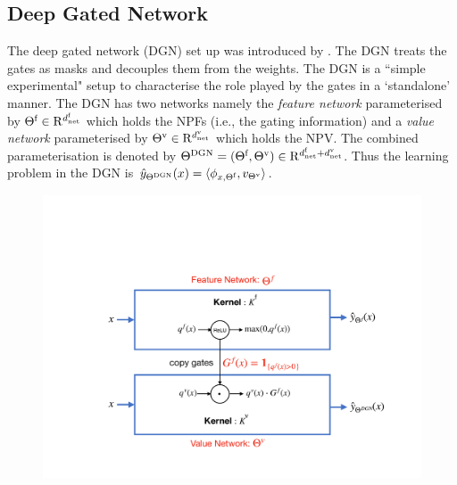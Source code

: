 \subsection{Deep Gated Network}
The deep gated network (DGN) set up was introduced by \cite{npk}. The DGN treats the gates as masks and decouples them from the weights. The DGN is a ``simple experimental" setup to characterise the role played by the gates in a `standalone' manner.  
The DGN has two networks namely the \emph{feature network} parameterised by $\Theta^{\textrm{f}}\in\mathrm{R}^{d^{\text{f}}_{\text{net}}}$ which holds the NPFs (i.e., the gating information) and a \emph{value network} parameterised by ${\Theta}^{\text{v}}\in\mathrm{R}^{d^{\text{v}}_{\text{net}}}$ which holds the NPV.  The combined parameterisation is denoted by $\Theta^{\text{DGN}}=(\Theta^{\textrm{f}},{\Theta}^{\text{v}})\in \mathrm{R}^{d^{\text{f}}_{\text{net}}+d^{\text{v}}_{\text{net}}}$.  Thus the learning problem in the DGN is $\hat{y}_{\Theta^{\text{DGN}}}(x)=\langle \phi_{x,\Theta^{\textrm{f}}},v_{{\Theta}^{\text{v}}}\rangle$. 
\FloatBarrier
\begin{figure}[H]
\begin{center}
\includegraphics[scale=0.3]{figs/dgn.pdf}
\end{center}
\end{figure}

